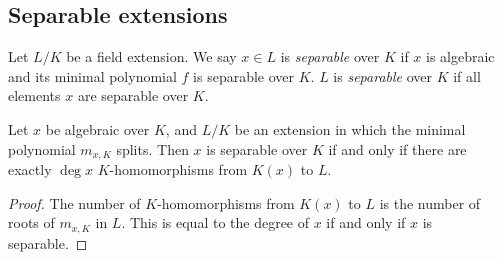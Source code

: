 \subsection{Separable extensions}
\begin{definition}
	Let \( L / K \) be a field extension.
	We say \( x \in L \) is \emph{separable} over \( K \) if \( x \) is algebraic and its minimal polynomial \( f \) is separable over \( K \).
	\( L \) is \emph{separable} over \( K \) if all elements \( x \) are separable over \( K \).
\end{definition}
\begin{theorem}
	Let \( x \) be algebraic over \( K \), and \( L / K \) be an extension in which the minimal polynomial \( m_{x,K} \) splits.
	Then \( x \) is separable over \( K \) if and only if there are exactly \( \deg x \) \( K \)-homomorphisms from \( K(x) \) to \( L \).
\end{theorem}
\begin{proof}
	The number of \( K \)-homomorphisms from \( K(x) \) to \( L \) is the number of roots of \( m_{x,K} \) in \( L \).
	This is equal to the degree of \( x \) if and only if \( x \) is separable.
\end{proof}
